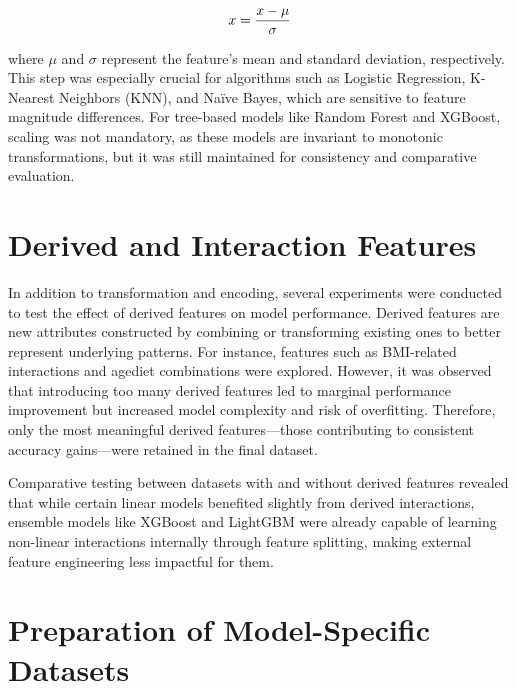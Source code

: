 \begin{equation}
    \centering
    x=\frac{x-\mu}{\sigma}
    \label{eq:eq_standard_Scaling}
\end{equation}

where $\mu$ and $\sigma$ represent the feature’s mean and standard deviation, respectively.
This step was especially crucial for algorithms such as Logistic Regression, K-Nearest Neighbors (KNN), and Naïve Bayes, which are sensitive to feature magnitude differences.
For tree-based models like Random Forest and XGBoost, scaling was not mandatory, as these models are invariant to monotonic transformations, but it was still maintained for consistency and comparative evaluation.



\section{Derived and Interaction Features}\label{sec:derived-and-interaction-features}

In addition to transformation and encoding, several experiments were conducted to test the effect of derived features on model performance.
Derived features are new attributes constructed by combining or transforming existing ones to better represent underlying patterns.
For instance, features such as BMI-related interactions and agediet combinations were explored.
However, it was observed that introducing too many derived features led to marginal performance improvement but increased model complexity and risk of overfitting.
Therefore, only the most meaningful derived features—those contributing to consistent accuracy gains—were retained in the final dataset.

Comparative testing between datasets with and without derived features revealed that while certain linear models benefited slightly from derived interactions, ensemble models like XGBoost and LightGBM were already capable of learning non-linear interactions internally through feature splitting, making external feature engineering less impactful for them.



\section{Preparation of Model-Specific Datasets}\label{sec:preparation-of-model-specific-datasets}

